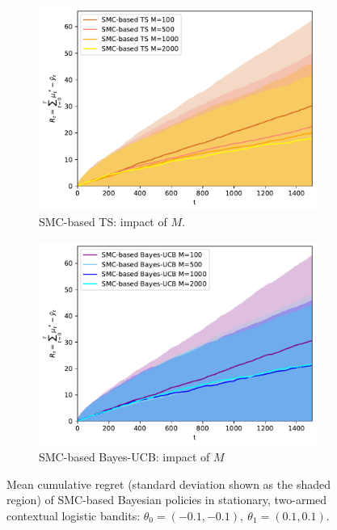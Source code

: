 \begin{figure}[!h]
	\begin{subfigure}[b]{0.46\textwidth}
		\centering
		\includegraphics[width=\textwidth]{./fods_figs/static/logistic/A2/theta-0.1_-0.1_0.1_0.1_allM_cumulative_regret_ts}
		\caption{SMC-based TS: impact of $M$.}
	\end{subfigure}
	\begin{subfigure}[b]{0.46\textwidth}
		\centering
		\includegraphics[width=\textwidth]{./fods_figs/static/logistic/A2/theta-0.1_-0.1_0.1_0.1_allM_cumulative_regret_bucb}
		\caption{SMC-based Bayes-UCB: impact of $M$}
	\end{subfigure}
	
	\caption{Mean cumulative regret (standard deviation shown as the shaded region) of SMC-based Bayesian policies in
		stationary, two-armed contextual logistic bandits:
		$\theta_0=(-0.1,-0.1), \ \theta_1=(0.1,0.1)$.}
\end{figure}

